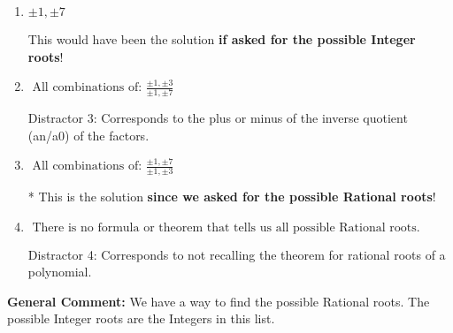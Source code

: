 \documentclass{extbook}[14pt]
\begin{document}
\begin{enumerate}
{\begin{enumerate}[label=\Alph*.]
 Distractor 1: Corresponds to the plus or minus factors of a1 only.
\item \( \pm 1,\pm 7 \)

This would have been the solution \textbf{if asked for the possible Integer roots}!
\item \( \text{ All combinations of: }\frac{\pm 1,\pm 3}{\pm 1,\pm 7} \)

 Distractor 3: Corresponds to the plus or minus of the inverse quotient (an/a0) of the factors. 
\item \( \text{ All combinations of: }\frac{\pm 1,\pm 7}{\pm 1,\pm 3} \)

* This is the solution \textbf{since we asked for the possible Rational roots}!
\item \( \text{ There is no formula or theorem that tells us all possible Rational roots.} \)

 Distractor 4: Corresponds to not recalling the theorem for rational roots of a polynomial.
\end{enumerate}

\textbf{General Comment:} We have a way to find the possible Rational roots. The possible Integer roots are the Integers in this list.
}
\end{enumerate}
\end{document}

